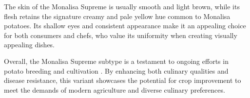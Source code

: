 The skin of the Monalisa Supreme is usually smooth and light brown, while its flesh retains the signature creamy and pale yellow hue common to Monalisa potatoes. Its shallow eyes and consistent appearance make it an appealing choice for both consumers and chefs, who value its uniformity when creating visually appealing dishes. \citep{yan_isotropic_2008}

Overall, the Monalisa Supreme subtype is a testament to ongoing efforts in potato breeding and cultivation \cite{du_vector-based_2017}. By enhancing both culinary qualities and disease resistance, this variant showcases the potential for crop improvement to meet the demands of modern agriculture and diverse culinary preferences.













